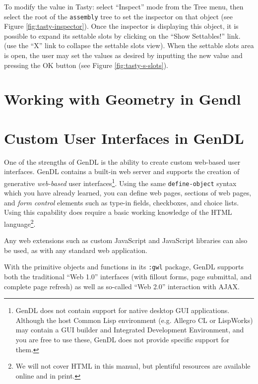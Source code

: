 \documentclass [11pt]{book}
\begin{document}
To modify the value in Tasty: select ``Inspect'' mode from the Tree
menu, then select the root of the \texttt{assembly} tree to set the inspector on that object (see Figure 
\ref{fig:tasty-inspector}). Once the inspector is displaying this object, it is
possible to expand its settable slots by clicking on the ``Show
Settables!''  link. (use the ``X'' link to collapse the settable slots
view). When the settable slots area is open, the user may set the
values as desired by inputting the new value and pressing the OK
button (see Figure 
\ref{fig:tasty-s-slots}).



\chapter{Working with Geometry in Gendl}

\label{chap:workingwithgeometryingendl}



\chapter{Custom User Interfaces in GenDL}

\label{chap:customuserinterfacesingendl}



One of the strengths of GenDL is the ability to create custom
web-based user interfaces. GenDL contains a built-in web server and
supports the creation of generative \emph{web-based} user interfaces\footnote{GenDL does not contain support for native desktop
GUI applications. Although the host Common Lisp
environment (e.g. Allegro CL or LispWorks) may contain a GUI builder
and Integrated Development Environment, and you are free to use these,
GenDL does not provide specific support for them.}. Using the same \texttt{define-object} syntax which you have already learned, you can define web
pages, sections of web pages, and \emph{form control} elements such as type-in fields, checkboxes, and choice
lists. Using this capability does require a basic working knowledge of
the HTML language\footnote{We will not cover HTML in this manual, but
plentiful resources are available online and in print.}.



Any web extensions such as custom JavaScript and JavaScript libraries
can also be used, as with any standard web application.



With the primitive objects and functions in its \texttt{:gwl} package, GenDL supports both the traditional ``Web 1.0''
interfaces (with fillout forms, page submittal, and complete page
refresh) as well as so-called ``Web 2.0'' interaction with AJAX.
\end{document}
